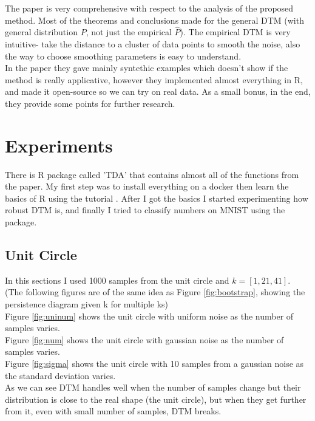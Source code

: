 \documentclass[11pt]{article}
\theoremstyle{definition}
\theoremstyle{definition}
\begin{document}
The paper is very comprehensive with respect to the analysis of the proposed method. Most of the theorems and conclusions made for the general DTM (with general distribution $P$, not just the empirical $\hat P$).
The empirical DTM is very intuitive- take the distance to a cluster of data points to smooth the noise, also the way to choose smoothing parameters is easy to understand.\\
In the paper they gave mainly syntethic examples which doesn't show if the method is really applicative, however they implemented almost everything in R, and made it open-source so we can try on real data. As a small bonus, in the end, they provide some points for further research.


\newcommand\figu[1]{Figure \ref{#1}}
\section{Experiments}
There is R package called 'TDA' that contains almost all of the functions from the paper.
My first step was to install everything on a docker then learn the basics of R using the tutorial \cite{tut}. After I got the basics I started experimenting how robust DTM is, and finally I tried to classify numbers on MNIST using the package.


\subsection{Unit Circle}


In this sections I used 1000 samples from the unit circle and $k = [1, 21, 41]$.\\
(The following figures are of the same idea as \figu{fig:bootstrap}, showing the persistence diagram given k for multiple ks)\\
\figu{fig:uninum} shows the unit circle with uniform noise as the number of samples varies.\\
\figu{fig:num} shows the unit circle with gaussian noise as the number of samples varies.\\
\figu{fig:sigma} shows the unit circle with 10 samples from a gaussian noise as the standard deviation varies.\\
As we can see DTM handles well when the number of samples change but their distribution is close to the real shape (the unit circle), but when they get further from it, even with small number of samples, DTM breaks.
\end{document}

